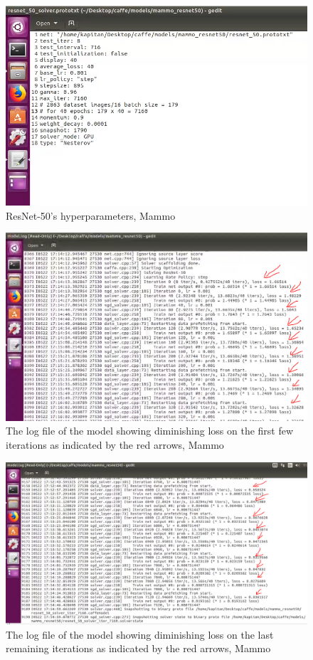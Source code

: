 \begin{figure}[h]
	\centering
  	\includegraphics[scale=0.6]{images/hyperparameters.png}
	\caption{ResNet-50's hyperparameters, Mammo}
  	\label{fig:hyperparameters}
\end{figure}

\begin{figure}[h]
	\centering
  	\includegraphics[scale=0.5]{images/firstModelLog.png}
	\caption{The log file of the model showing diminishing loss on the first few iterations as indicated by the red arrows, Mammo}
  	\label{fig:firstModelLog1}
\end{figure}

\begin{figure}[h]
	\centering
  	\includegraphics[scale=0.5]{images/firstModelLog2.png}
	\caption{The log file of the model showing diminishing loss on the last remaining iterations as indicated by the red arrows, Mammo}
  	\label{fig:firstModelLog2}
\end{figure}

